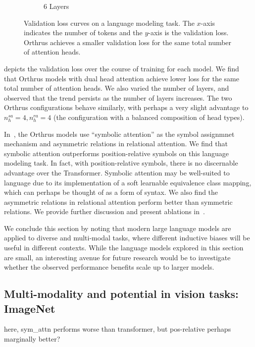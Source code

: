 \begin{figure}[ht]
\begin{subfigure}{0.33\textwidth}
        \caption{6 Layers}
    \end{subfigure}
    \caption{Validation loss curves on a language modeling task. The $x$-axis indicates the number of tokens and the $y$-axis is the validation loss. Orthrus achieves a smaller validation loss for the same total number of attention heads.}\label{fig:tiny_stories_val_loss_curves}
\end{figure}

 depicts the validation loss over the course of training for each model. We find that Orthrus models with dual head attention achieve lower loss for the same total number of attention heads. We also varied the number of layers, and observed that the trend persists as the number of layers increases. The two Orthrus configurations behave similarly, with perhaps a very slight advantage to $n_h^{sa} = 4, n_h^{ra} = 4$ (the configuration with a balanced composition of head types).

In~, the Orthrus models use ``symbolic attention'' as the symbol assignmnet mechanism and asymmetric relations in relational attention. We find that symbolic attention outperforms position-relative symbols on this language modeling task. In fact, with position-relative symbols, there is no discernable advantage over the Transformer. Symbolic attention may be well-suited to language due to its implementation of a soft learnable equivalence class mapping, which can perhaps be thought of as a form of syntax. We also find the asymmetric relations in relational attention perform better than symmetric relations. We provide further discussion and present ablations in~.

We conclude this section by noting that modern large language models are applied to diverse and multi-modal tasks, where different inductive biases will be useful in different contexts. While the language models explored in this section are small, an interesting avenue for future research would be to investigate whether the observed performance benefits scale up to larger models.

\subsection{Multi-modality and potential in vision tasks: ImageNet}\label{ssec:imagenett}


here, sym\_attn performs worse than transformer, but pos-relative perhaps marginally better?